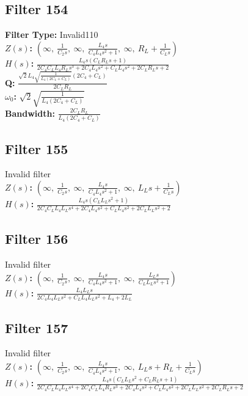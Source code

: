 \documentclass{article}
\begin{document}
\subsection*{Filter 154}
\textbf{Filter Type:} Invalid110 \\ 
\textbf{$Z(s)$:} $\left( \infty, \  \frac{1}{C_{2} s}, \  \infty, \  \frac{L_{4} s}{C_{4} L_{4} s^{2} + 1}, \  \infty, \  R_{L} + \frac{1}{C_{L} s}\right)$ \\ 
\textbf{$H(s)$:} $\frac{L_{4} s \left(C_{L} R_{L} s + 1\right)}{2 C_{4} C_{L} L_{4} R_{L} s^{3} + 2 C_{4} L_{4} s^{2} + C_{L} L_{4} s^{2} + 2 C_{L} R_{L} s + 2}$ \\ 
\textbf{Q:} $\frac{\sqrt{2} L_{4} \sqrt{\frac{1}{L_{4} \left(2 C_{4} + C_{L}\right)}} \left(2 C_{4} + C_{L}\right)}{2 C_{L} R_{L}}$ \\ 
\textbf{$\omega_0$:} $\sqrt{2} \sqrt{\frac{1}{L_{4} \left(2 C_{4} + C_{L}\right)}}$ \\ 
\textbf{Bandwidth:} $\frac{2 C_{L} R_{L}}{L_{4} \left(2 C_{4} + C_{L}\right)}$ \\ 
\subsection*{Filter 155}
Invalid filter \\ 
\textbf{$Z(s)$:} $\left( \infty, \  \frac{1}{C_{2} s}, \  \infty, \  \frac{L_{4} s}{C_{4} L_{4} s^{2} + 1}, \  \infty, \  L_{L} s + \frac{1}{C_{L} s}\right)$ \\ 
\textbf{$H(s)$:} $\frac{L_{4} s \left(C_{L} L_{L} s^{2} + 1\right)}{2 C_{4} C_{L} L_{4} L_{L} s^{4} + 2 C_{4} L_{4} s^{2} + C_{L} L_{4} s^{2} + 2 C_{L} L_{L} s^{2} + 2}$ \\ 
\subsection*{Filter 156}
Invalid filter \\ 
\textbf{$Z(s)$:} $\left( \infty, \  \frac{1}{C_{2} s}, \  \infty, \  \frac{L_{4} s}{C_{4} L_{4} s^{2} + 1}, \  \infty, \  \frac{L_{L} s}{C_{L} L_{L} s^{2} + 1}\right)$ \\ 
\textbf{$H(s)$:} $\frac{L_{4} L_{L} s}{2 C_{4} L_{4} L_{L} s^{2} + C_{L} L_{4} L_{L} s^{2} + L_{4} + 2 L_{L}}$ \\ 
\subsection*{Filter 157}
Invalid filter \\ 
\textbf{$Z(s)$:} $\left( \infty, \  \frac{1}{C_{2} s}, \  \infty, \  \frac{L_{4} s}{C_{4} L_{4} s^{2} + 1}, \  \infty, \  L_{L} s + R_{L} + \frac{1}{C_{L} s}\right)$ \\ 
\textbf{$H(s)$:} $\frac{L_{4} s \left(C_{L} L_{L} s^{2} + C_{L} R_{L} s + 1\right)}{2 C_{4} C_{L} L_{4} L_{L} s^{4} + 2 C_{4} C_{L} L_{4} R_{L} s^{3} + 2 C_{4} L_{4} s^{2} + C_{L} L_{4} s^{2} + 2 C_{L} L_{L} s^{2} + 2 C_{L} R_{L} s + 2}$ \\ 
\end{document}
